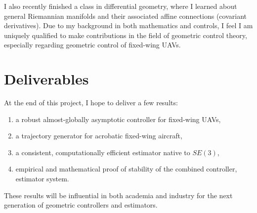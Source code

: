 \documentclass[letterpaper, 10 pt, conference]{ieeeconf}  %
\begin{document}
I also recently finished a class in differential geometry, where I learned about general Riemannian manifolds and their associated affine connections (covariant derivatives). Due to my background in both mathematics and controls, I feel I am uniquely qualified to make contributions in the field of geometric control theory, especially regarding geometric control of fixed-wing UAVs.

\section{Deliverables}%
At the end of this project, I hope to deliver a few results:
\begin{enumerate}
  \item a robust almost-globally asymptotic controller for fixed-wing UAVs,
  \item a trajectory generator for acrobatic fixed-wing aircraft,
  \item a consistent, computationally efficient estimator native to $SE(3)$,
  \item empirical and mathematical proof of stability of the combined controller, estimator system.
\end{enumerate}
These results will be influential in both academia and industry for the next generation of geometric controllers and estimators.


 

\end{document}
